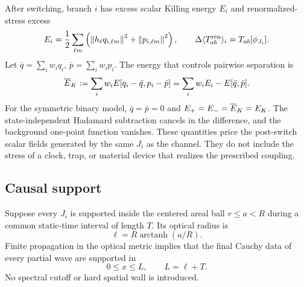 After switching, branch $i$ has excess scalar Killing energy $E_i$ and
renormalized-stress excess
\begin{equation}
 E_i=\frac12\sum_{\ell m}
 \left(\left\lVert h_\ell q_{i,\ell m}\right\rVert^2+\left\lVert p_{i,\ell m}\right\rVert^2\right),
 \qquad
 \Delta\langle T_{ab}^{\rm ren}\rangle_i=T_{ab}[\phi_{J_i}].
 \label{eq:energy-stress}
\end{equation}
Let $\bar q=\sum_iw_iq_i$, $\bar p=\sum_iw_ip_i$.  The energy that controls
pairwise separation is
\begin{equation}
 \overline E_{K}:=\sum_iw_i E[q_i-\bar q,p_i-\bar p]
 =\sum_iw_iE_i-E[\bar q,\bar p].
 \label{eq:centered-field-energy}
\end{equation}
For the symmetric binary model, $\bar q=\bar p=0$ and
$E_+=E_-=\overline E_{K}=E_{K}$.
The state-independent Hadamard subtraction cancels in the difference, and the
background one-point function vanishes.  These quantities price the
post-switch scalar fields generated by the same $J_i$ as the channel.  They do
not include the stress of a clock, trap, or material device that realizes the
prescribed coupling.

\subsection{Causal support}

Suppose every $J_i$ is supported inside the centered areal ball $r\leq a<R$
during a common static-time interval of length $T$.  Its optical radius is
\begin{equation}
 \ell=R\operatorname{arctanh}(a/R).
 \label{eq:source-optical-radius}
\end{equation}
Finite propagation in the optical metric implies that the final Cauchy data of
every partial wave are supported in
\begin{equation}
 0\leq x\leq L,
 \qquad L=\ell+T.
 \label{eq:causal-support}
\end{equation}
No spectral cutoff or hard spatial wall is introduced.
